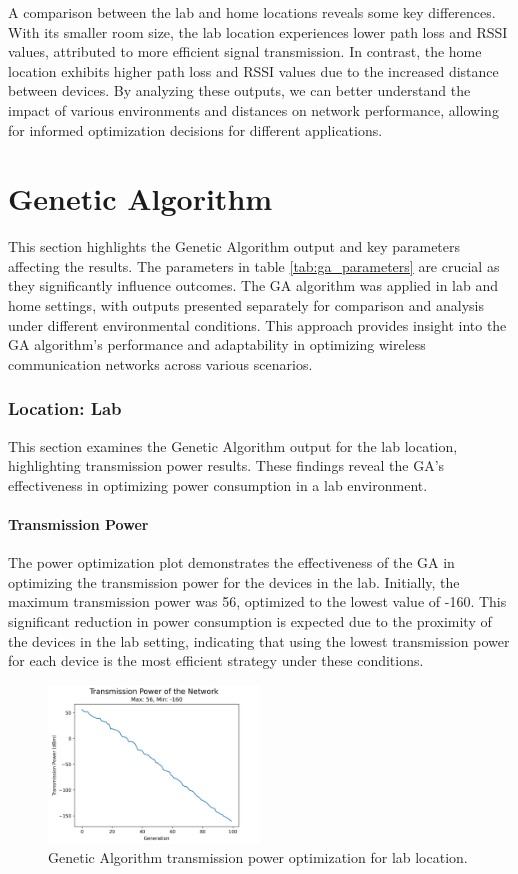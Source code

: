 A comparison between the lab and home locations reveals some key differences. With its smaller room size, the lab location experiences lower path loss and RSSI values, attributed to more efficient signal transmission. In contrast, the home location exhibits higher path loss and RSSI values due to the increased distance between devices. By analyzing these outputs, we can better understand the impact of various environments and distances on network performance, allowing for informed optimization decisions for different applications.


\section{Genetic Algorithm}\label{sec:genetic_algorithm_output}
This section highlights the Genetic Algorithm output and key parameters affecting the results. The parameters in table \ref{tab:ga_parameters} are crucial as they significantly influence outcomes. The GA algorithm was applied in lab and home settings, with outputs presented separately for comparison and analysis under different environmental conditions. This approach provides insight into the GA algorithm's performance and adaptability in optimizing wireless communication networks across various scenarios.


\subsubsection{Location: Lab}
This section examines the Genetic Algorithm output for the lab location, highlighting transmission power results. These findings reveal the GA's effectiveness in optimizing power consumption in a lab environment.

\paragraph{Transmission Power}
The power optimization plot demonstrates the effectiveness of the GA in optimizing the transmission power for the devices in the lab. Initially, the maximum transmission power was 56, optimized to the lowest value of -160. This significant reduction in power consumption is expected due to the proximity of the devices in the lab setting, indicating that using the lowest transmission power for each device is the most efficient strategy under these conditions.

\begin{figure}[h]
  \centering
  \includegraphics[width=0.5\textwidth]{images/research_results/genetic_algorithm_lab_power.png}
    \caption{Genetic Algorithm transmission power optimization for lab location.}
    \label{fig:genetic_algorithm_lab_power}
\end{figure}

